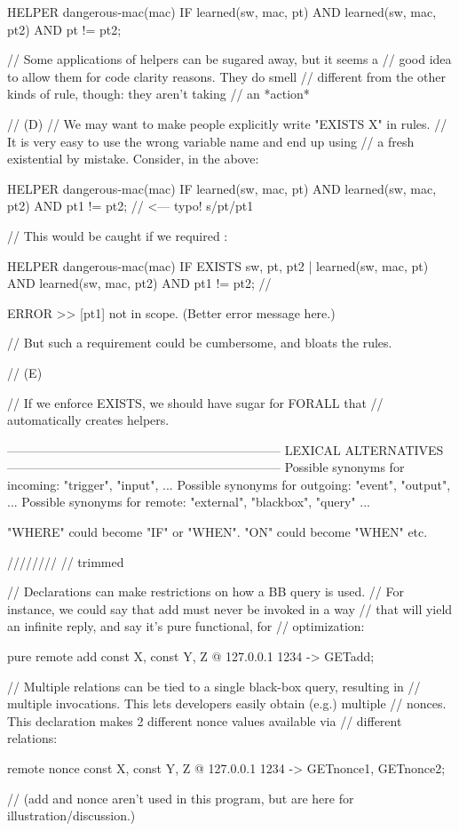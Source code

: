 HELPER dangerous-mac(mac) IF
  learned(sw, mac, pt) AND
  learned(sw, mac, pt2) AND
  pt != pt2;

// Some applications of helpers can be sugared away, but it seems a
// good idea to allow them for code clarity reasons. They do smell
// different from the other kinds of rule, though: they aren't taking
// an *action* 

// (D)
// We may want to make people explicitly write "EXISTS X" in rules.
// It is very easy to use the wrong variable name and end up using
// a fresh existential by mistake. Consider, in the above:

HELPER dangerous-mac(mac) IF
  learned(sw, mac, pt) AND
  learned(sw, mac, pt2) AND
  pt1 != pt2;  // <--- typo! s/pt/pt1

// This would be caught if we required :

HELPER dangerous-mac(mac) IF
  EXISTS sw, pt, pt2 |
    learned(sw, mac, pt) AND
    learned(sw, mac, pt2) AND
    pt1 != pt2;  // 

ERROR >> [pt1] not in scope. (Better error message here.)

// But such a requirement could be cumbersome, and bloats the rules.

// (E)

// If we enforce EXISTS, we should have sugar for FORALL that
// automatically creates helpers.
















------------------------------------------------------------------
LEXICAL ALTERNATIVES
------------------------------------------------------------------
Possible synonyms for incoming: "trigger", "input", ...
Possible synonyms for outgoing: "event", "output", ...
Possible synonyms for remote: "external", "blackbox", "query" ...

"WHERE" could become "IF" or "WHEN".
"ON" could become "WHEN" 
etc.



////////
// trimmed


  // Declarations can make restrictions on how a BB query is used. 
  // For instance, we could say that add must never be invoked in a way
  // that will yield an infinite reply, and say it's pure functional, for 
  // optimization:

  pure remote add {const X, const Y, Z} @ 127.0.0.1 1234 -> 
    GETadd;

  // Multiple relations can be tied to a single black-box query, resulting in
  // multiple invocations. This lets developers easily obtain (e.g.) multiple
  // nonces. This declaration makes 2 different nonce values available via
  // different relations:

  remote nonce {const X, const Y, Z} @ 127.0.0.1 1234 -> 
    GETnonce1, GETnonce2;

  // (add and nonce aren't used in this program, but are here for illustration/discussion.)
